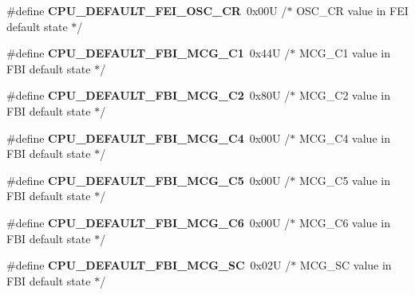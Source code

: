 \begin{DoxyCompactItemize}
\item 
\#define {\bfseries C\+P\+U\+\_\+\+D\+E\+F\+A\+U\+L\+T\+\_\+\+F\+E\+I\+\_\+\+O\+S\+C\+\_\+\+CR}~0x00\+U     /$\ast$ O\+S\+C\+\_\+\+C\+R value in F\+E\+I default state $\ast$/\hypertarget{group___c_p_u___config__module_ga02b3e7f32e8d99ef1f99ecb7ac6849a8}{}\label{group___c_p_u___config__module_ga02b3e7f32e8d99ef1f99ecb7ac6849a8}

\item 
\#define {\bfseries C\+P\+U\+\_\+\+D\+E\+F\+A\+U\+L\+T\+\_\+\+F\+B\+I\+\_\+\+M\+C\+G\+\_\+\+C1}~0x44\+U     /$\ast$ M\+C\+G\+\_\+\+C1 value in F\+B\+I default state $\ast$/\hypertarget{group___c_p_u___config__module_ga0861cc314726c10bfe8b8dd6d6685a91}{}\label{group___c_p_u___config__module_ga0861cc314726c10bfe8b8dd6d6685a91}

\item 
\#define {\bfseries C\+P\+U\+\_\+\+D\+E\+F\+A\+U\+L\+T\+\_\+\+F\+B\+I\+\_\+\+M\+C\+G\+\_\+\+C2}~0x80\+U     /$\ast$ M\+C\+G\+\_\+\+C2 value in F\+B\+I default state $\ast$/\hypertarget{group___c_p_u___config__module_ga29a34f0e28c74ce8d3261d6dbafdd3a6}{}\label{group___c_p_u___config__module_ga29a34f0e28c74ce8d3261d6dbafdd3a6}

\item 
\#define {\bfseries C\+P\+U\+\_\+\+D\+E\+F\+A\+U\+L\+T\+\_\+\+F\+B\+I\+\_\+\+M\+C\+G\+\_\+\+C4}~0x00\+U     /$\ast$ M\+C\+G\+\_\+\+C4 value in F\+B\+I default state $\ast$/\hypertarget{group___c_p_u___config__module_ga38b848fb5e30a1da9818856dd5e5f75e}{}\label{group___c_p_u___config__module_ga38b848fb5e30a1da9818856dd5e5f75e}

\item 
\#define {\bfseries C\+P\+U\+\_\+\+D\+E\+F\+A\+U\+L\+T\+\_\+\+F\+B\+I\+\_\+\+M\+C\+G\+\_\+\+C5}~0x00\+U     /$\ast$ M\+C\+G\+\_\+\+C5 value in F\+B\+I default state $\ast$/\hypertarget{group___c_p_u___config__module_gaae4b0db8b80c2f32d50eab7d3b86f5df}{}\label{group___c_p_u___config__module_gaae4b0db8b80c2f32d50eab7d3b86f5df}

\item 
\#define {\bfseries C\+P\+U\+\_\+\+D\+E\+F\+A\+U\+L\+T\+\_\+\+F\+B\+I\+\_\+\+M\+C\+G\+\_\+\+C6}~0x00\+U     /$\ast$ M\+C\+G\+\_\+\+C6 value in F\+B\+I default state $\ast$/\hypertarget{group___c_p_u___config__module_ga4c8d65a134cad74a1f1aed9ca36b7c57}{}\label{group___c_p_u___config__module_ga4c8d65a134cad74a1f1aed9ca36b7c57}

\item 
\#define {\bfseries C\+P\+U\+\_\+\+D\+E\+F\+A\+U\+L\+T\+\_\+\+F\+B\+I\+\_\+\+M\+C\+G\+\_\+\+SC}~0x02\+U     /$\ast$ M\+C\+G\+\_\+\+S\+C value in F\+B\+I default state $\ast$/\hypertarget{group___c_p_u___config__module_ga9f2bbf04cd1f43bbb7cdd2ca3bbea738}{}\label{group___c_p_u___config__module_ga9f2bbf04cd1f43bbb7cdd2ca3bbea738}


\end{DoxyCompactItemize}
